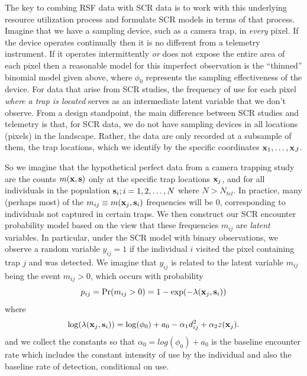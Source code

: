 \documentclass[12pt]{article}
\begin{document}
The key to combing RSF data with SCR data is to work with this
underlying resource utilization process and formulate SCR models in
terms of that process.  Imagine that we have a sampling device, such
as a camera trap, in {\it every} pixel. If the device operates
continually then it is no different from a telemetry instrument.  If
it operates intermittently {\it or} does not expose the entire area of
each pixel then a reasonable model for this imperfect observation is
the ``thinned'' binomial model given above, where $\phi_{0}$
represents the sampling effectiveness of the device.  For data that
arise from SCR studies, the frequency of use for each pixel {\it where
  a trap is located} serves as an intermediate latent variable that we
don't observe. From a design standpoint, the main difference between
SCR studies and telemetry is that, for SCR data, we do not have
sampling devices in all locations (pixels) in the landscape. Rather,
the data are only recorded at a subsample of them, the trap locations,
which we identify by the specific coordinates ${\bf x}_{1},\ldots,{\bf
  x}_{J}$.

So we imagine
that the hypothetical perfect data from a camera trapping study are
the counts $m({\bf x},{\bf s})$ only at the specific trap locations
${\bf x}_{j}$, and for all individuals in the population ${\bf s}_{i};
i=1,2,\ldots,N$ where $N> N_{tel}$.  In practice, many (perhaps most)
of the $m_{ij} \equiv m({\bf x}_{j},{\bf s}_{i})$ frequencies will be 0,
corresponding to individuals not captured in certain traps. 
We then construct our SCR encounter 
probability model based on the
view that these frequencies $m_{ij}$ are {\it latent} variables. In particular,
under the SCR model with binary observations,
 we observe a random variable
$y_{ij} = 1$  if the individual $i$ visited the pixel
containing trap $j$ and was detected.
We imagine that $y_{ij}$ is related to the latent variable $m_{ij}$ being the
event $m_{ij}>0$, which occurs with probability
\[
 p_{ij} = \Pr(m_{ij}>0) =  1-\exp(- \lambda({\bf x}_{j},{\bf s}_{i}))
\]
where
\[
 \log(\lambda({\bf x}_{j},{\bf s}_{i}) ) = \log(\phi_{0}) + a_{0} -\alpha_{1} d_{ij}^{2} +  \alpha_{2} z({\bf x}_{j}).
\]
and we collect the constants so that $\alpha_{0} = log(\phi_{0}) +
a_{0}$ is the
 baseline encounter rate which includes
the constant intensity of use by the individual and also the baseline
rate of detection, conditional on use.
\end{document}
